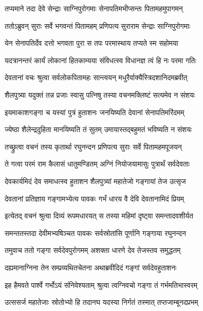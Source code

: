 
\twolineshloka
{तप्यमाने तदा देवे सेन्द्राः साग्निपुरोगमाः}
{सेनापतिमभीप्सन्तः पितामहमुपागमन्} %

\twolineshloka
{ततोऽब्रुवन् सुराः सर्वे भगवन्तं पितामहम्}
{प्रणिपत्य सुराराम सेन्द्राः साग्निपुरोगमाः} %

\twolineshloka
{येन सेनापतिर्देव दत्तो भगवता पुरा}
{स तपः परमास्थाय तप्यते स्म सहोमया} %

\twolineshloka
{यदत्रानन्तरं कार्यं लोकानां हितकाम्यया}
{संविधत्स्व विधानज्ञ त्वं हि नः परमा गतिः} %

\twolineshloka
{देवतानां वचः श्रुत्वा सर्वलोकपितामहः}
{सान्त्वयन् मधुरैर्वाक्यैस्त्रिदशानिदमब्रवीत्} %

\twolineshloka
{शैलपुत्र्या यदुक्तं तन्न प्रजाः स्वासु पत्निषु}
{तस्या वचनमक्लिष्टं सत्यमेव न संशयः} %

\twolineshloka
{इयमाकाशगङ्गा च यस्यां पुत्रं हुताशनः}
{जनयिष्यति देवानां सेनापतिमरिंदमम्} %

\twolineshloka
{ज्येष्ठा शैलेन्द्रदुहिता मानयिष्यति तं सुतम्}
{उमायास्तद्बहुमतं भविष्यति न संशयः} %

\twolineshloka
{तच्छ्रुत्वा वचनं तस्य कृतार्था रघुनन्दन}
{प्रणिपत्य सुराः सर्वे पितामहमपूजयन्} %

\twolineshloka
{ते गत्वा परमं राम कैलासं धातुमण्डितम्}
{अग्निं नियोजयामासुः पुत्रार्थं सर्वदेवताः} %

\twolineshloka
{देवकार्यमिदं देव समाधत्स्व हुताशन}
{शैलपुत्र्यां महातेजो गङ्गायां तेज उत्सृज} %

\twolineshloka
{देवतानां प्रतिज्ञाय गङ्गामभ्येत्य पावकः}
{गर्भं धारय वै देवि देवतानामिदं प्रियम्} %

\twolineshloka
{इत्येतद् वचनं श्रुत्वा दिव्यं रूपमधारयत्}
{स तस्या महिमां दृष्ट्वा समन्तादवशीर्यत} %

\twolineshloka
{समन्ततस्तदा देवीमभ्यषिञ्चत पावकः}
{सर्वस्रोतांसि पूर्णानि गङ्गाया रघुनन्दन} %

\twolineshloka
{तमुवाच ततो गङ्गा सर्वदेवपुरोगमम्}
{अशक्ता धारणे देव तेजस्तव समुद्धतम्} %

\twolineshloka
{दह्यमानाग्निना तेन सम्प्रव्यथितचेतना}
{अथाब्रवीदिदं गङ्गां सर्वदेवहुताशनः} %

\twolineshloka
{इह हैमवते पार्श्वे गर्भोऽयं संनिवेश्यताम्}
{श्रुत्वा त्वग्निवचो गङ्गा तं गर्भमतिभास्वरम्} %

\twolineshloka
{उत्ससर्ज महातेजाः स्रोतोभ्यो हि तदानघ}
{यदस्या निर्गतं तस्मात् तप्तजाम्बूनदप्रभम्} %

